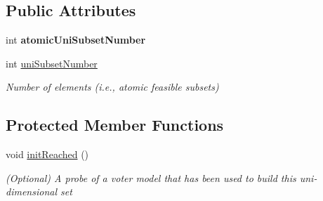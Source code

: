 \subsection*{Public Attributes}
\begin{DoxyCompactItemize}
\item 
\hypertarget{classUniSet_addac67921c058dc9ffa2074b3d59151f}{int {\bfseries atomic\-Uni\-Subset\-Number}}\label{classUniSet_addac67921c058dc9ffa2074b3d59151f}

\item 
\hypertarget{classUniSet_a159ec0413efd05616c2f2445b7d8b2b5}{int \hyperlink{classUniSet_a159ec0413efd05616c2f2445b7d8b2b5}{uni\-Subset\-Number}}\label{classUniSet_a159ec0413efd05616c2f2445b7d8b2b5}

\begin{DoxyCompactList}\small\item\em Number of elements (i.\-e., atomic feasible subsets) \end{DoxyCompactList}\end{DoxyCompactItemize}
\subsection*{Protected Member Functions}
\begin{DoxyCompactItemize}
\item 
void \hyperlink{classUniSet_a140f02dfb3f186cbc49fe28d238aa2e1}{init\-Reached} ()
\begin{DoxyCompactList}\small\item\em (Optional) A probe of a voter model that has been used to build this uni-\/dimensional set \end{DoxyCompactList}\end{DoxyCompactItemize}
